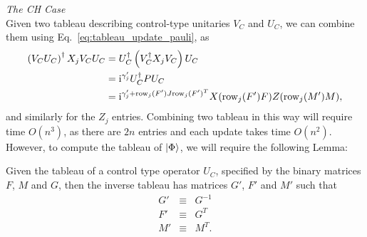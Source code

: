 \large{\itshape{The CH Case}}\\
Given two tableau describing control-type unitaries $V_C{}$ and $U_{C}$, we can combine them using Eq.~\ref{eq:tableau_update_pauli}, as 
\begin{align*}
\left(V_{C}U_{C}\right)^{\dagger} X_{j}V_{C}U_{C} &= U_{C}^{\dagger}\left(V_{C}^{\dagger} X_{j} V_{C}\right)U_{C}\\
&=\mathrm{i}^{\gamma'_{j}}U_{C}^{\dagger}P U_{C}\\
&= \mathrm{i}^{\gamma'_{j}+\text{row}_{j}(F')J\text{row}_{j}(F')^{T}}X(\text{row}_{j}(F')F)Z(\text{row}_{j}(M')M),
\end{align*}
and similarly for the $Z_{j}$ entries. Combining two tableau in this way will require time $O(n^{3})$, as there are $2n$ entries and each update takes time $O(n^{2})$. However, to compute the tableau of $\ket{\Phi}$, we will require the following Lemma:
\begin{lem}\label{lem:inverse_tableau}
Given the tableau of a control type operator $U_{C}$, specified by the binary matrices $F$, $M$ and $G$, then the inverse tableau has matrices $G'$, $F'$ and $M'$ such that
\begin{equation}
\begin{array}{rcl}
G' & \equiv & G^{-1}\\
F' & \equiv & G^{T} \\
M' & \equiv & M^{T}.\\
\end{array}
\end{equation}
\end{lem}
